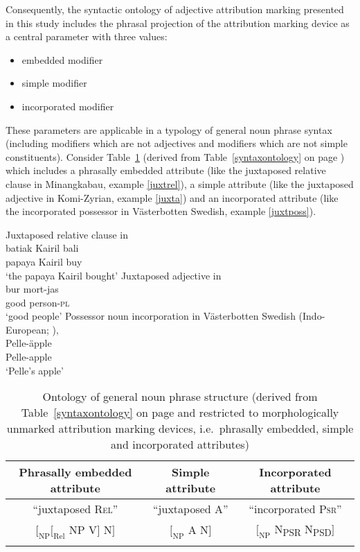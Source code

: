 Consequently, the syntactic ontology of adjective attribution marking presented in this study includes the phrasal projection of the attribution marking device as a central parameter with three values:
\begin{itemize}
\item embedded modifier
\item simple modifier
\item incorporated modifier
\end{itemize}
These parameters are applicable in a typology of general noun phrase syntax (including modifiers which are not adjectives and modifiers which are not simple constituents). Consider Table~\ref{ontologyderived} (derived from Table~\ref{syntaxontology} on page \pageref{syntaxontology}) which includes a phrasally embedded attribute (like the juxtaposed relative clause in Minangkabau, example \ref{juxtrel}), a simple attribute (like the juxtaposed adjective in Komi-Zyrian, example \ref{juxta}) and an incorporated attribute (like the incorporated possessor in Västerbotten Swedish, example \ref{juxtposs}).
\begin{exe}
\ex
\begin{xlist}
\ex \label{juxtrel}
\rm{Juxtaposed relative clause in }\\
\gll batiak Kairil bali\\
	papaya Kairil buy\\
\glt	‘the papaya Kairil bought’
\ex \label{juxta}
\rm{Juxtaposed adjective in }\\
\gll		bur	mort-jas\\
		good	person-\textsc{pl}\\
\glt		‘good people’
\ex \label{juxtposs}
\rm{Possessor noun incorporation in Västerbotten Swedish (Indo-European; \citealt[3–4]{gil2005})}‚\\
\gll	Pelle-äpple\\
	Pelle-apple\\
\glt	‘Pelle's apple’
\end{xlist}
\end{exe}
\begin{table}
\begin{tabular}{c c c}
\lsptoprule
Phrasally embedded	attribute		&Simple	attribute				&Incorporated attribute\\
\midrule
“juxtaposed \textsc{Rel}”		&“juxtaposed \textsc{A}”		&“incorporated \textsc{Psr}”\\
\midrule
$[_{\text{NP}} [_{\text{Rel}}$ NP V$]$ N$]$	&$[_{\text{NP}}$ A N$]$			&$[_{\text{NP}}$ N\textsubscript{PSR} N\textsubscript{PSD}$]$\\
\lspbottomrule
\end{tabular}
\caption[Ontology of general noun phrase structure]{Ontology of general noun phrase structure (derived from Table~\ref{syntaxontology} on page \pageref{syntaxontology} and restricted to morphologically unmarked attribution marking devices, i.e.~phrasally embedded, simple and incorporated attributes)}\label{ontologyderived}
\end{table}

